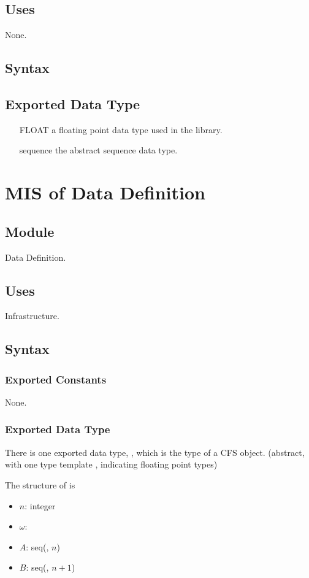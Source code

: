 \documentclass[12pt, titlepage]{article}
\begin{document}
\subsection{Uses}

None.
\subsection{Syntax}
\subsection{Exported Data Type}
\begin{itemize}
	\item[FLOAT] a floating point data type used in the library.
	\item [sequence] the abstract sequence data type.
\end{itemize}

\section{MIS of Data Definition} \label{MIS:DataDef}
\subsection{Module}

Data Definition.

\subsection{Uses}

Infrastructure.

\subsection{Syntax}

\subsubsection{Exported Constants}
None.
\subsubsection{Exported Data Type}
There is one exported data type, , which is the type of a CFS object. (abstract, with one type template , indicating floating point types)

The structure of  is
\begin{itemize}
	\item $n$: integer
	\item $\omega$: 
	\item $A$: seq(, $n$)
	\item $B$: seq(, $n+1$)
\end{itemize}
\end{document}
